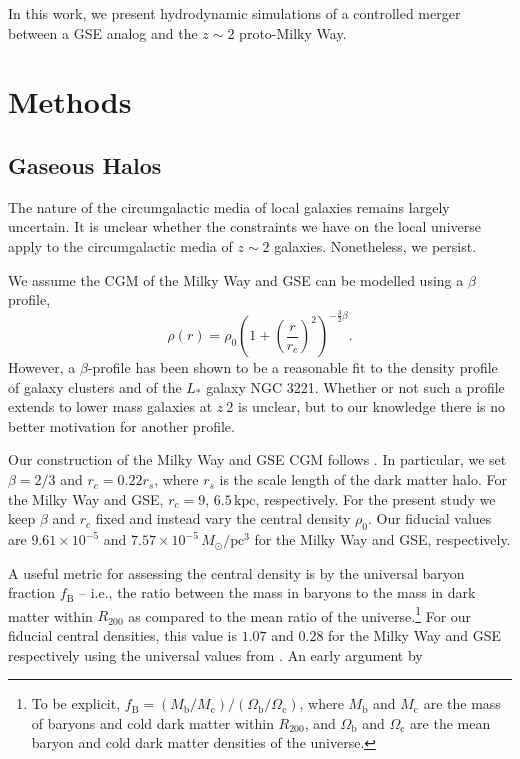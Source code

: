 \documentclass[linenumbers, twocolumn]{aastex631}
\newcommand{\Msun}{\ensuremath{M_{\odot}}}
\newcommand{\pc}{\ensuremath{\textrm{pc}}}
\begin{document}
In this work, we present hydrodynamic simulations of a controlled merger between
a GSE analog and the $z\sim2$ proto-Milky Way. 

\section{Methods}\label{sec:methods}

\subsection{Gaseous Halos}\label{ssec:gashalo} 

The nature of the circumgalactic media of local galaxies remains largely
uncertain. It is unclear whether the constraints we have on the local universe
apply to the circumgalactic media of $z\sim2$ galaxies. Nonetheless, we persist.

We assume the CGM of the Milky Way and GSE can be modelled using a $\beta$ profile,
\begin{equation}
  \rho(r) = \rho_0 \left( 1 + \left(\frac{r}{r_c}\right)^2 \right)^{-\frac{3}{2}\beta}\textrm{.}
\end{equation}
However, a $\beta$-profile has been shown to be a reasonable fit to the density
profile of galaxy clusters and of the $L_{*}$ galaxy NGC 3221. Whether or not
such a profile extends to lower mass galaxies at $z~2$ is unclear, but to our
knowledge there is no better motivation for another profile.

Our construction of the Milky Way and GSE CGM follows
\citet{2023MNRAS.tmp.2070B}. In particular, we set $\beta=2/3$ and $r_c=0.22
r_s$, where $r_s$ is the scale length of the dark matter halo. For the Milky Way
and GSE, $r_c=9$, $6.5\,\textrm{kpc}$, respectively. For the present study we
keep $\beta$ and $r_c$ fixed and instead vary the central density $\rho_0$. Our
fiducial values are $9.61\times10^{-5}$ and $7.57\times10^{-5}\,\Msun/\pc^3$ for
the Milky Way and GSE, respectively.

A useful metric for assessing the central density is by the universal baryon
fraction $f_{\textrm{B}}$ -- i.e., the ratio between the mass in baryons to the
mass in dark matter within $R_{200}$ as compared to the mean ratio of the
universe.\footnote{To be explicit,
$f_{\textrm{B}}=(M_{\textrm{b}}/M_{\textrm{c}})/(\Omega_{\textrm{b}}/\Omega_{\textrm{c}})$,
where $M_{\textrm{b}}$ and $M_{\textrm{c}}$ are the mass of baryons and cold
dark matter within $R_{200}$, and $\Omega_{\textrm{b}}$ and
$\Omega_{\textrm{c}}$ are the mean baryon and cold dark matter densities of the
universe.} For our fiducial central densities, this value is $1.07$ and $0.28$
for the Milky Way and GSE respectively using the universal values from
\cite{2014AA...571A..16P}. An early argument by 
\end{document}
